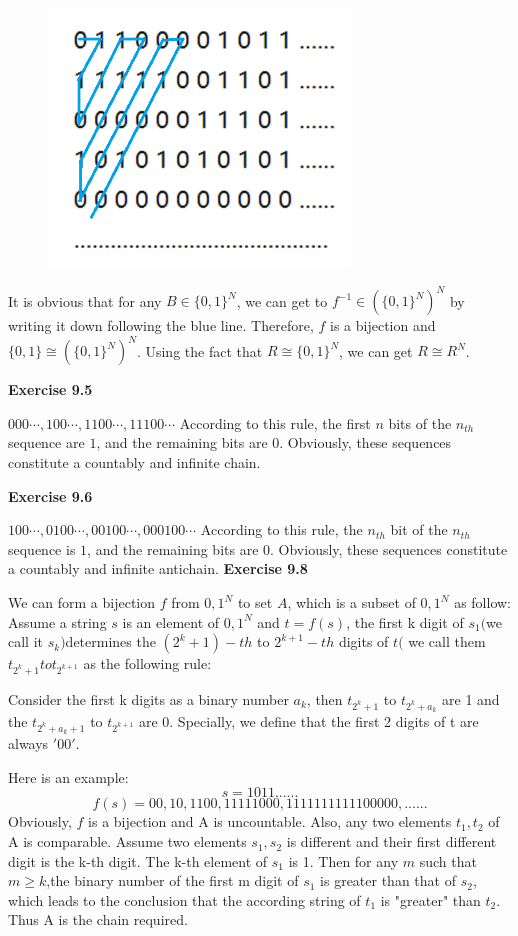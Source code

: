\documentclass{article} %
\begin{document}
\begin{figure}[H]
    \centering
    \includegraphics[width=8cm]{9_3_1.png}
    \caption{}
    \label{}
    \end{figure}
It is obvious that for any $B\in \{0,1\}^N$, we can get to $f^{-1}\in (\{0,1\}^N)^N$ by writing it down following the blue line. Therefore, $f$ is a bijection and $\{0,1\}\cong (\{0,1\}^N)^N$. Using the fact that $R\cong \{0,1\}^N$, we can get $R\cong R^N$.


	\textbf{Exercise 9.5}\par
    $000\cdots,100\cdots,1100\cdots,11100\cdots$ According to this rule, the first $n$ bits of the $n_{th}$ sequence are $1$, and the remaining bits are $0$. Obviously, these sequences constitute a countably and infinite chain.
	
	\textbf{Exercise 9.6}\par
	$100\cdots,0100\cdots,00100\cdots,000100\cdots$ According to this rule, the $n_{th}$ bit of the $n_{th}$ sequence is $1$, and the remaining bits are $0$. Obviously, these sequences constitute a countably and infinite antichain.
	\textbf{Exercise 9.8}\par
	 We can form a bijection $f$ from ${0,1}^N$ to set $A$, which is a subset of ${0,1}^N$ as follow: Assume a string $s$ is an element of ${0,1}^N$ and  $t=f(s)$, the first k digit of $s_1 ($we call it $s_k)$determines the $(2^{k}+1)-th$ to $2^{k+1}-th $ digits of $t ($ we  call them $t_{2^k+1} to t_{2^{k+1}}$ as the following rule:\par
	 
	 	 Consider the first k digits as a binary number $a_k$, then $t_{2^k+1}$ to $t_{2^k+a_k}$ are 1 and the $t_{2^k+a_k+1}$ to $t_{2^{k+1}}$ are 0. Specially, we define that the first 2 digits of t are always $'00'$.  
	 
	 Here is an example:
	 $$
	 s=1011......
	 $$
	 $$
	 f(s)=00,10,1100,11111000,1111111111100000,......
	 $$
	 Obviously, $f$ is a bijection and A is uncountable. Also, any two elements $t_1,t_2$ of A is comparable. Assume two elements $s_1,s_2$ is different and their first different digit is the k-th digit. The k-th element of $s_1$ is 1. Then for any $m$ such that $m \ge k$,the binary number of the first m digit of $s_1$ is greater than that of $s_2$, which leads to the conclusion that the according string of $t_1$ is "greater" than $t_2$. Thus A is the chain required. 

	
\end{document}
